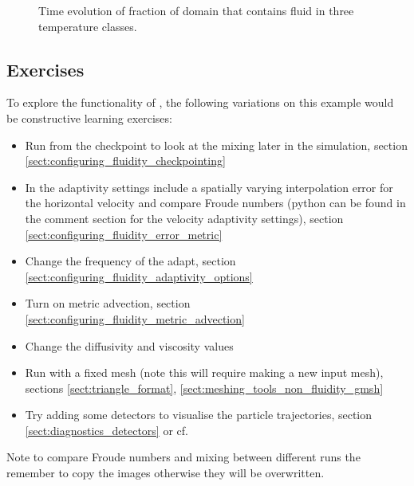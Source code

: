 \begin{figure}[ht]
  \centering
  \caption{Time evolution of fraction of domain that contains fluid in three temperature classes.}
  \label{fig:lock_exchange_mixing}
\end{figure}

\subsection{Exercises}
\label{sect:le_exercises}
To explore the functionality of \fluidity, the following variations on this example would be constructive learning exercises:
\begin{itemize}
\item Run from the checkpoint to look at the mixing later in the simulation, section \ref{sect:configuring_fluidity_checkpointing}
\item In the adaptivity settings include a spatially varying interpolation error for the horizontal velocity and compare Froude numbers (python can be found in the comment section for the velocity adaptivity settings), section \ref{sect:configuring_fluidity_error_metric}
\item Change the frequency of the adapt, section \ref{sect:configuring_fluidity_adaptivity_options}
\item Turn on metric advection, section \ref{sect:configuring_fluidity_metric_advection}
\item Change the diffusivity and viscosity values
\item Run with a fixed mesh (note this will require making a new input mesh), sections \ref{sect:triangle_format}, \ref{sect:meshing_tools_non_fluidity_gmsh}
\item Try adding some detectors to visualise the particle trajectories, section \ref{sect:diagnostics_detectors} or \newline cf. 
\end{itemize}
Note to compare Froude numbers and mixing between different runs the remember to copy the images otherwise they will be overwritten.

